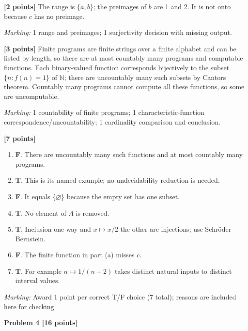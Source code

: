 \documentclass[12pt,letterpaper]{article}
\newcommand{\problemheading}[2][5\baselineskip]{\Needspace{#1}\par\noindent\hspace*{-0.625in}\textbf{#2}\par\nobreak\vspace{0.3em}}
\begin{document}
\begin{description}[font=\normalfont,leftmargin=1.2em,labelsep=0.4em]
\item[(a)] \textbf{[2 points]} The range is $\{a,b\}$; the preimages of $b$ are 1 and 2. It is not onto because $c$ has no preimage.
\par\textit{Marking:} 1 range and preimages; 1 surjectivity decision with missing output.
\item[(b)] \textbf{[3 points]} Finite programs are finite strings over a finite alphabet and can be listed by length, so there are at most countably many programs and computable functions. Each binary-valued function corresponds bijectively to the subset $\{n:f(n)=1\}$ of $\mathbb N$; there are uncountably many such subsets by Cantor\textquotesingle s theorem. Countably many programs cannot compute all these functions, so some are uncomputable.
\par\textit{Marking:} 1 countability of finite programs; 1 characteristic-function correspondence/uncountability; 1 cardinality comparison and conclusion.
\item[(c)] \textbf{[7 points]} \begin{enumerate}[label=(\roman*)]\item \textbf{F}. There are uncountably many such functions and at most countably many programs.\item \textbf{T}. This is its named example; no undecidability reduction is needed.\item \textbf{F}. It equals $\{\varnothing\}$ because the empty set has one subset.\item \textbf{T}. No element of $A$ is removed.\item \textbf{T}. Inclusion one way and $x\mapsto x/2$ the other are injections; use Schr\"oder--Bernstein.\item \textbf{F}. The finite function in part (a) misses $c$.\item \textbf{T}. For example $n\mapsto1/(n+2)$ takes distinct natural inputs to distinct interval values.\end{enumerate}
\par\textit{Marking:} Award 1 point per correct T/F choice (7 total); reasons are included here for checking.
\end{description}
\vspace{0.65em}
\problemheading[\dimexpr 3\baselineskip+4\baselineskip\relax]{Problem 4 [16 points]}
\end{document}
